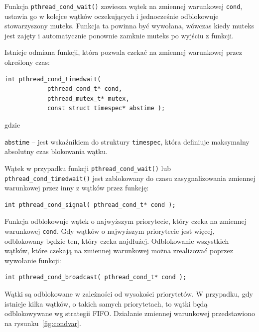 Funkcja \lstinline[style=MyCStyle]{pthread_cond_wait()} zawiesza wątek na zmiennej warunkowej \lstinline[style=MyCStyle]{cond}, ustawia go w kolejce wątków oczekujących i jednocześnie odblokowuje stowarzyszony muteks. Funkcja ta powinna być wywołana, wówczas kiedy muteks jest zajęty i automatycznie ponownie zamknie muteks po wyjściu z funkcji.

Istnieje odmiana funkcji, która pozwala czekać na zmiennej warunkowej przez określony czas:

\begin{lstlisting}[style=MyCStyle]
int pthread_cond_timedwait(
            pthread_cond_t* cond,
            pthread_mutex_t* mutex,
            const struct timespec* abstime );
\end{lstlisting}
gdzie
\begin{myitemize}
\item \lstinline[style=MyCStyle]{abstime} -- jest wskaźnikiem do struktury \lstinline[style=MyCStyle]{timespec}, która definiuje maksymalny absolutny czas blokowania wątku.
\end{myitemize}

Wątek w przypadku funkcji \lstinline[style=MyCStyle]{pthread_cond_wait()} lub \lstinline[style=MyCStyle]{pthread_cond_timedwait()} jest zablokowany do czasu zasygnalizowania zmiennej warunkowej przez  inny z wątków przez funkcję:

\begin{lstlisting}[style=MyCStyle]
int pthread_cond_signal( pthread_cond_t* cond );
\end{lstlisting}

Funkcja odblokowuje wątek o najwyższym priorytecie, który czeka na zmiennej warunkowej \lstinline[style=MyCStyle]{cond}. Gdy wątków o najwyższym priorytecie jest więcej, odblokowany będzie ten, który czeka najdłużej. Odblokowanie wszystkich wątków, które czekają na zmiennej warunkowej można zrealizować poprzez wywołanie funkcji:

\begin{lstlisting}[style=MyCStyle]
int pthread_cond_broadcast( pthread_cond_t* cond );
\end{lstlisting}

Wątki są odblokowane w zależności od wysokości priorytetów. W przypadku, gdy istnieje kilka wątków, o takich samych priorytetach, to wątki będą odblokowywane wg strategii FIFO. Działanie zmiennej warunkowej przedstawiono na rysunku~\ref{fig:condvar}.


